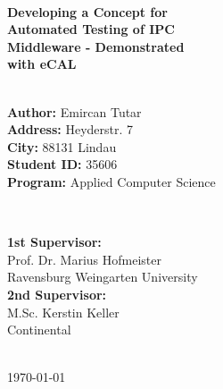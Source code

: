 \documentclass[a4paper,12pt,singlespacing]{article}
\begin{document}
\begin{titlepage}
	
	\HRule \\[0.4cm]
	{ \huge \bfseries Developing a Concept for\\[0.01cm]
		Automated Testing of IPC \\[0.01cm]
		Middleware - Demonstrated\\[0.4cm]
		 with eCAL }\\[0.2cm]
	\HRule \\[1.5cm]

	
	\hspace*{0.40cm}
	\begin{minipage}{0.5\textwidth}
		\begin{flushleft}\fontsize{11pt}{14pt}\selectfont
			\textbf{Author:} Emircan Tutar\\[4pt]
			\textbf{Address:} Heyderstr. 7\\[4pt]
			\textbf{City:} 88131 Lindau\\[7pt]
			\textbf{Student ID:} 35606\\[4pt]
			\textbf{Program:} Applied Computer Science\\[4pt]
		\end{flushleft}
	\end{minipage}
	~
	\begin{minipage}{0.43\textwidth}
		\begin{flushleft} \fontsize{11pt}{14pt}\selectfont
			\textbf{1st Supervisor:} \\[2pt]
			Prof. Dr. Marius Hofmeister \\
			Ravensburg Weingarten University \\[10pt]
			\textbf{2nd Supervisor:} \\[2pt]
			M.Sc. Kerstin Keller \\
			Continental\\[7pt]
		\end{flushleft}
	\end{minipage}\\[2cm]
	
	
	{\large \today}\\[0cm] %
	
	\vfill %
	
	
\end{titlepage}
\end{document}
